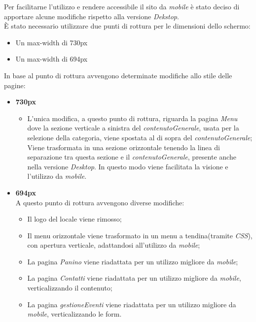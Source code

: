 Per facilitarne l'utilizzo e rendere accessibile il sito da \emph{mobile} è stato deciso di apportare alcune modifiche rispetto alla versione \emph{Dekstop}.\\
È stato necessario utilizzare due punti di rottura per le dimensioni dello schermo:
\begin{itemize}
	\item Un max-width di 730px
	\item Un max-width di 694px
\end{itemize}
In base al punto di rottura avvengono determinate modifiche allo stile delle pagine:
\begin{itemize}
	\item \textbf{730px}
	\begin{itemize}
		\item L'unica modifica, a questo punto di rottura, riguarda la pagina \emph{Menu} dove la sezione verticale a sinistra del \emph{contenutoGenerale}, usata per la selezione della categoria, viene spostata al di sopra del \emph{contenutoGenerale};
Viene trasformata in una sezione orizzontale tenendo la linea di separazione tra questa sezione e il \emph{contenutoGenerale}, presente anche nella versione \emph{Desktop}. 
In questo modo viene facilitata la visione e l'utilizzo da \emph{mobile}.
	\end{itemize}
	\item \textbf{694px}\\
	A questo punto di rottura avvengono diverse modifiche:
	\begin{itemize}
		\item Il logo del locale viene rimosso;
		\item Il menu orizzontale viene trasformato in un menu a tendina(tramite \emph{CSS}), con apertura verticale, adattandosi all'utilizzo da \emph{mobile};
		\item La pagina \emph{Panino} viene riadattata per un utilizzo migliore da \emph{mobile};
		\item La pagina \emph{Contatti} viene riadattata per un utilizzo migliore da \emph{mobile}, verticalizzando il contenuto;
		\item La pagina \emph{gestioneEventi} viene riadattata per un utilizzo migliore da \emph{mobile}, verticalizzando le form.
	\end{itemize}
\end{itemize}